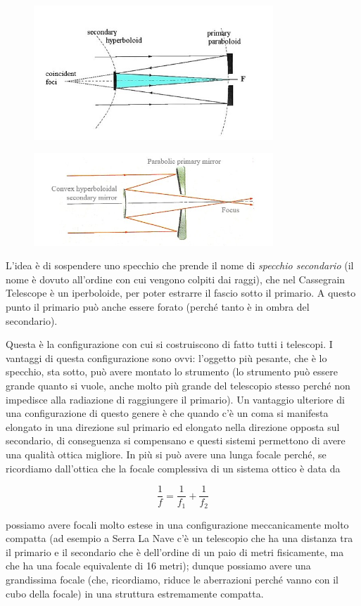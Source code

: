 \begin{figure}[H]
        \centering
        \includegraphics[width=9cm]{2.jpg}
    \end{figure}
\begin{figure}[H]
        \centering
        \includegraphics[width=9cm]{3.jpg}
    \end{figure}

L'idea è di sospendere uno specchio che prende il nome di \textit{specchio secondario} (il nome è dovuto all'ordine con cui vengono colpiti dai raggi), che nel Cassegrain Telescope è un iperboloide, per poter estrarre il fascio sotto il primario. A questo punto il primario può anche essere forato (perché tanto è in ombra del secondario).

Questa è la configurazione con cui si costruiscono di fatto tutti i telescopi. I vantaggi di questa configurazione sono ovvi: l'oggetto più pesante, che è lo specchio, sta sotto, può avere montato lo strumento (lo strumento può essere grande quanto si vuole, anche molto più grande del telescopio stesso perché non impedisce alla radiazione di raggiungere il primario). Un vantaggio ulteriore di una configurazione di questo genere è che quando c'è un coma si manifesta elongato in una direzione sul primario ed elongato nella direzione opposta sul secondario, di conseguenza si compensano e questi sistemi permettono di avere una qualità ottica migliore. In più si può avere una lunga focale perché, se ricordiamo dall'ottica che la focale complessiva di un sistema ottico è data da

$$\frac{1}{f} = \frac{1}{f_1} + \frac{1}{f_2}$$

possiamo avere focali molto estese in una configurazione meccanicamente molto compatta (ad esempio a Serra La Nave c'è un telescopio che ha una distanza tra il primario e il secondario che è dell'ordine di un paio di metri fisicamente, ma che ha una focale equivalente di 16 metri); dunque possiamo avere una grandissima focale (che, ricordiamo, riduce le aberrazioni perché vanno con il cubo della focale) in una struttura estremamente compatta.

